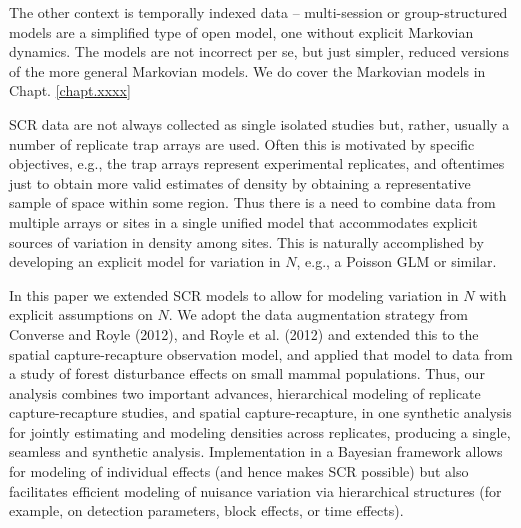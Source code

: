 The other context is temporally indexed data -- multi-session or
group-structured models are a simplified type of open model, one
without explicit Markovian dynamics. The models are not incorrect per
se, but just simpler, reduced versions of the more general Markovian
models. We do cover the Markovian models in Chapt. \ref{chapt.xxxx}


SCR data are not
always collected as single isolated studies but, rather, usually a number of
replicate trap arrays are used. Often this is motivated by specific
objectives, e.g., the trap arrays represent experimental replicates,
and oftentimes just to obtain more valid estimates of density by
obtaining a representative sample of space within some region.  Thus
there is a need to combine data from multiple arrays or sites in a
single unified model that accommodates explicit sources of variation
in density among sites.  This is naturally accomplished by developing
an explicit model for variation in $N$, e.g., a Poisson GLM or
similar.

In this paper we extended SCR models to allow for modeling variation
in $N$ with explicit assumptions on $N$. We adopt the data
augmentation strategy from Converse and Royle (2012), and Royle et
al. (2012) and extended this to the spatial capture-recapture
observation model, and applied that model to data from a study of
forest disturbance effects on small mammal populations.  Thus, our analysis
combines two important advances, hierarchical modeling of replicate
capture-recapture studies, and spatial capture-recapture, in one
synthetic analysis for jointly estimating and modeling densities
across replicates, producing a single, seamless and synthetic
analysis.  Implementation in a Bayesian framework allows for modeling
of individual effects (and hence makes SCR possible) but also
facilitates efficient modeling of nuisance variation via hierarchical
structures (for example, on detection parameters, block effects, or
time effects).


